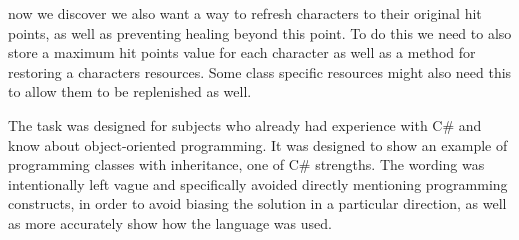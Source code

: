 now we discover we also want a way to refresh characters to their original hit points, as well as preventing healing beyond this point.
To do this we need to also store a maximum hit points value for each character as well as a method for restoring a characters resources.
Some class specific resources might also need this to allow them to be replenished as well.

The task was designed for subjects who already had experience with C# and know about object-oriented programming.
It was designed to show an example of programming classes with inheritance, one of C# strengths.
The wording was intentionally left vague and specifically avoided directly mentioning programming constructs, in order to avoid biasing the solution in a particular direction, as well as more accurately show how the language was used.